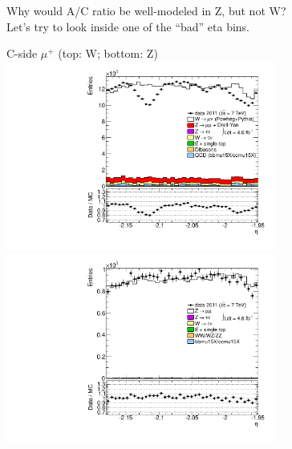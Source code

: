 {
 {
Why would A/C ratio be well-modeled in Z, but not W? \\
Let's try to look inside one of the ``bad'' eta bins.
}


 {
\colb[T]

C-side $\mu^{+}$ (top: W; bottom: Z)
\centering
\includegraphics[width=0.66\textwidth]{dates/20130306/figures/etaphi/W_10_C_stack_l_eta_POS} \\
\includegraphics[width=0.66\textwidth]{dates/20130306/figures/etaphi/Z_10_C_stack_lP_eta_ALL.pdf}

}}
